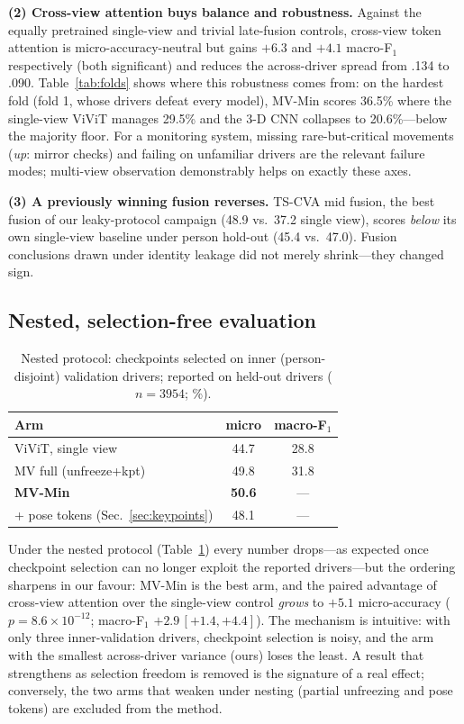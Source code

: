 \documentclass[journal]{IEEEtran}
\newcommand{\micro}{micro-accuracy}
\newcommand{\mF}{macro-F$_1$}
\newcommand{\mvmin}{MV-Min}
\begin{document}
\textbf{(2) Cross-view attention buys balance and robustness.}  Against the
equally pretrained single-view and trivial late-fusion controls, cross-view
token attention is \micro-neutral but gains $+6.3$ and $+4.1$ \mF{}
respectively (both significant) and reduces the across-driver spread from
.134 to .090.  Table~\ref{tab:folds} shows where this robustness comes
from: on the hardest fold (fold 1, whose drivers defeat every model),
\mvmin{} scores 36.5\% where the single-view ViViT manages 29.5\% and the
3-D CNN collapses to 20.6\%---below the majority floor.  For a monitoring
system, missing rare-but-critical movements (\emph{up}: mirror checks) and
failing on unfamiliar drivers are the relevant failure modes; multi-view
observation demonstrably helps on exactly these axes.

\textbf{(3) A previously winning fusion reverses.}  TS-CVA mid fusion, the
best fusion of our leaky-protocol campaign (48.9 vs.\ 37.2 single view),
scores \emph{below} its own single-view baseline under person hold-out
(45.4 vs.\ 47.0).  Fusion conclusions drawn under identity leakage did not
merely shrink---they changed sign.

\subsection{Nested, selection-free evaluation}
\begin{table}[t]
\caption{Nested protocol: checkpoints selected on inner (person-disjoint)
validation drivers; reported on held-out drivers ($n{=}3954$; \%).}
\label{tab:nested}
\centering\footnotesize
\begin{tabular}{lcc}
\toprule
Arm & micro & \mF \\
\midrule
ViViT, single view        & 44.7 & 28.8 \\
MV full (unfreeze+kpt)    & 49.8 & 31.8 \\
\textbf{\mvmin{}}         & \textbf{50.6} & --- \\
\;\;+ pose tokens (Sec.~\ref{sec:keypoints}) & 48.1 & --- \\
\bottomrule
\end{tabular}
\end{table}
Under the nested protocol (Table~\ref{tab:nested}) every number drops---as
expected once checkpoint selection can no longer exploit the reported
drivers---but the ordering sharpens in our favour: \mvmin{} is the best
arm, and the paired advantage of cross-view attention over the single-view
control \emph{grows} to $+5.1$ \micro{} ($p{=}8.6\times10^{-12}$;
\mF{} $+2.9\,[+1.4,+4.4]$).  The mechanism is intuitive: with only three
inner-validation drivers, checkpoint selection is noisy, and the arm with
the smallest across-driver variance (ours) loses the least.  A result that
strengthens as selection freedom is removed is the signature of a real
effect; conversely, the two arms that weaken under nesting (partial
unfreezing and pose tokens) are excluded from the method.
\end{document}
